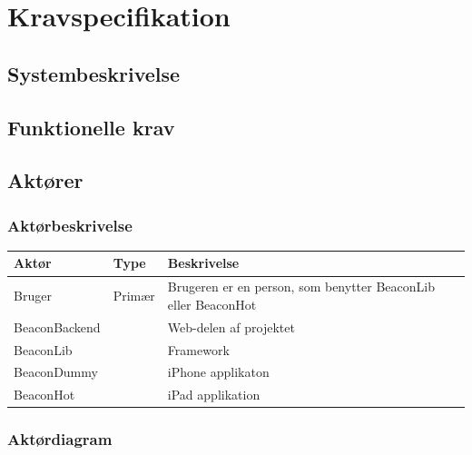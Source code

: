 \chapter{Kravspecifikation}
\label{ch:kravspecifikation}

\section{Systembeskrivelse}

\section{Funktionelle krav}
\section{Aktører}
\subsection{Aktørbeskrivelse}

\begin{table}[h]
\begin{tabular}{@{}lll@{}}
\toprule
\textbf{Aktør} & \textbf{Type} & \textbf{Beskrivelse}                                          \\ \midrule
Bruger         & Primær        & Brugeren er en person, som benytter BeaconLib eller BeaconHot \\ \midrule
BeaconBackend  &               & Web-delen af projektet                                        \\ \midrule
BeaconLib      &               & Framework                                                     \\ \midrule
BeaconDummy    &               & iPhone applikaton                                             \\ \midrule
BeaconHot      &               & iPad applikation                                              \\ \bottomrule
\end{tabular}
\end{table}

\subsection{Aktørdiagram}
